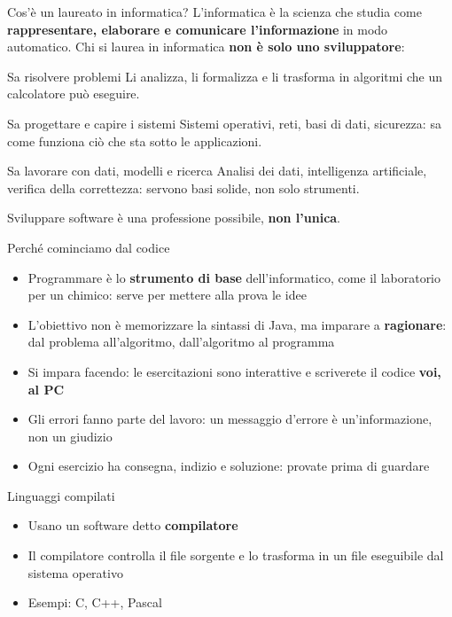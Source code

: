 \documentclass[aspectratio=169,10pt,t]{beamer}
\begin{document}

\begin{frame}{Cos'\`e un laureato in informatica?}
  L'informatica \`e la scienza che studia come \textbf{rappresentare, elaborare e comunicare l'informazione} in modo automatico. Chi si laurea in informatica \textbf{non \`e solo uno sviluppatore}:
  \begin{block}{Sa risolvere problemi}
    Li analizza, li formalizza e li trasforma in algoritmi che un calcolatore pu\`o eseguire.
  \end{block}
  \begin{block}{Sa progettare e capire i sistemi}
    Sistemi operativi, reti, basi di dati, sicurezza: sa come funziona ci\`o che sta sotto le applicazioni.
  \end{block}
  \begin{block}{Sa lavorare con dati, modelli e ricerca}
    Analisi dei dati, intelligenza artificiale, verifica della correttezza: servono basi solide, non solo strumenti.
  \end{block}
  Sviluppare software \`e una professione possibile, \textbf{non l'unica}.
\end{frame}

\begin{frame}{Perch\'e cominciamo dal codice}
  \begin{itemize}
    \item Programmare \`e lo \textbf{strumento di base} dell'informatico, come il laboratorio per un chimico: serve per mettere alla prova le idee
    \item L'obiettivo non \`e memorizzare la sintassi di Java, ma imparare a \textbf{ragionare}: dal problema all'algoritmo, dall'algoritmo al programma
    \item Si impara facendo: le esercitazioni sono interattive e scriverete il codice \textbf{voi, al PC}
    \item Gli errori fanno parte del lavoro: un messaggio d'errore \`e un'informazione, non un giudizio
    \item Ogni esercizio ha consegna, indizio e soluzione: provate prima di guardare
  \end{itemize}
\end{frame}

\begin{frame}{Linguaggi compilati}
  \begin{itemize}
    \item Usano un software detto \textbf{compilatore}
    \item Il compilatore controlla il file sorgente e lo trasforma in un file eseguibile dal sistema operativo
    \item Esempi: C, C++, Pascal
  \end{itemize}
  \vspace{1.5em}
  \begin{center}\small
    \freccia{}\freccia{}\freccia{}\freccia{}
  \end{center}
\end{frame}
\end{document}
